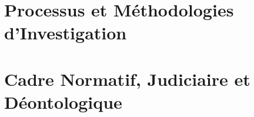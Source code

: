 \documentclass[12pt, twoside, openright, a4paper]{book}
\begin{document}
        
       
        
      
        
       
    \part{Processus et Méthodologies d'Investigation}
    \label{part:methodologie}

        
      
        
       
        
       
        
      
    \part{Cadre Normatif, Judiciaire et Déontologique}
    \label{part:normatif}

        
       
        
       
        
       
        
      

\appendix

    

    
\end{document}
